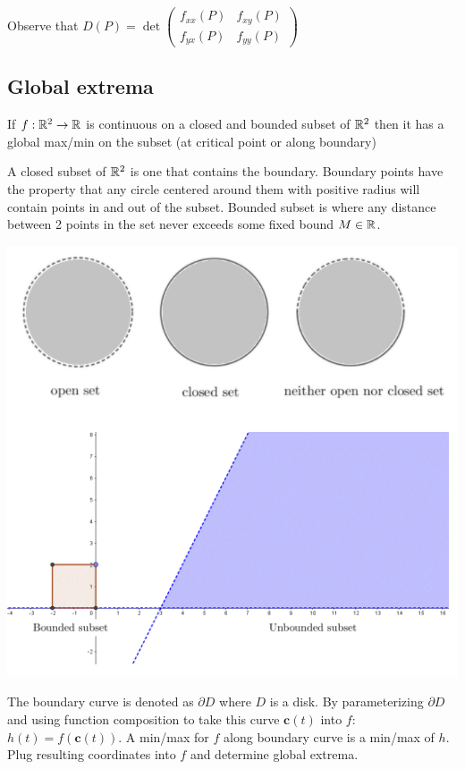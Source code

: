 Observe that $D(P)=\operatorname{det}\left(\begin{array}{ll}
                f_{x x}(P) & f_{x y}(P) \\
                f_{y x}(P) & f_{y y}(P)
            \end{array}\right)$

\subsection{Global extrema}

If $f:\mathbb{R}^2 \rightarrow \mathbb{R}$ is continuous on a closed and bounded subset of $\mathbb{R}^2$ then it has a global max/min
on the subset (at critical point or along boundary)

A closed subset of $\mathbb{R}^2$ is one that contains the boundary. Boundary points have the property that
any circle centered around them with positive radius will contain points in and out of the subset.
Bounded subset is where any distance between 2 points in the set never exceeds some fixed bound $M\in \mathbb{R}$.

\begin{center}
    \includegraphics[scale=0.5]{figures/Screen Shot 2021-03-22 at 3.01.05 PM.png}
\end{center}

The boundary curve is denoted as $\partial D$ where $D$ is a disk. By parameterizing $\partial D$ and using function
composition to take this curve $\textbf{c}(t)$ into $f$: $h(t)=f(\textbf{c}(t))$. A min/max for $f$ along boundary curve
is a min/max of $h$. Plug resulting coordinates into $f$ and determine global extrema.

